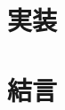 \documentclass[10pt]{jarticle}
\begin{document}
    \section{実装}%
      
    \section{結\hspace{2zw}言}%

    \vspace{5truemm}
    {\footnotesize
        \begin{thebibliography}{99}
            
            
            
            
            
            
        \end{thebibliography}
    }
    \normalsize
    
\end{document}
